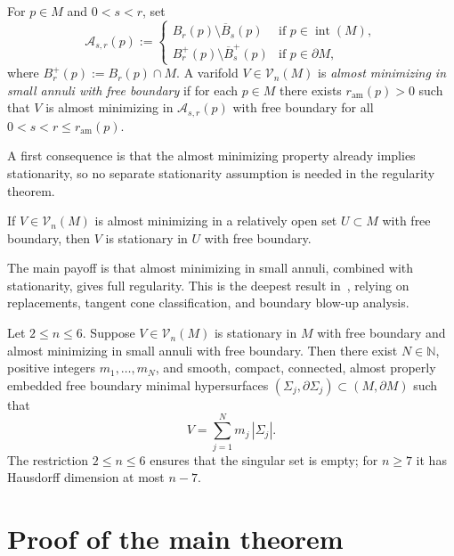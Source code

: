 \begin{definition}\label{def:am-small-annuli}
For $p\in M$ and $0<s<r$, set
\[
\mathcal{A}_{s,r}(p):=
\begin{cases}
B_r(p)\setminus\overline{B}_s(p) & \text{if } p\in\operatorname{int}(M),\\
B_r^+(p)\setminus\overline{B}^+_s(p) & \text{if } p\in\partial M,
\end{cases}
\]
where $B_r^+(p):=B_r(p)\cap M$. A varifold $V\in\mathcal{V}_n(M)$ is \emph{almost minimizing in small annuli with free boundary} if for each $p\in M$ there exists $r_{\mathrm{am}}(p)>0$ such that $V$ is almost minimizing in $\mathcal{A}_{s,r}(p)$ with free boundary for all $0<s<r\le r_{\mathrm{am}}(p)$.
\end{definition}

A first consequence is that the almost minimizing property already implies stationarity, so no separate stationarity assumption is needed in the regularity theorem.

\begin{proposition}[{\cite[Proposition~4.21]{LZ17}}]\label{prop:am-stationary}
If $V\in\mathcal{V}_n(M)$ is almost minimizing in a relatively open set $U\subset M$ with free boundary, then $V$ is stationary in $U$ with free boundary.
\end{proposition}

The main payoff is that almost minimizing in small annuli, combined with stationarity, gives full regularity. This is the deepest result in~\cite{LZ17}, relying on replacements, tangent cone classification, and boundary blow-up analysis.

\begin{theorem}\label{thm:main-regularity}
Let $2\le n\le 6$. Suppose $V\in\mathcal{V}_n(M)$ is stationary in $M$ with free boundary and almost minimizing in small annuli with free boundary. Then there exist $N\in\mathbb{N}$, positive integers $m_1,\ldots,m_N$, and smooth, compact, connected, almost properly embedded free boundary minimal hypersurfaces $(\Sigma_j,\partial\Sigma_j)\subset(M,\partial M)$ such that
\[
V=\sum_{j=1}^N m_j\,|\Sigma_j|.
\]
The restriction $2 \leq n \leq 6$ ensures that the singular set is empty; for $n \geq 7$ it has Hausdorff dimension at most $n - 7$.
\end{theorem}

\section{Proof of the main theorem}\label{sec:main-proof}

